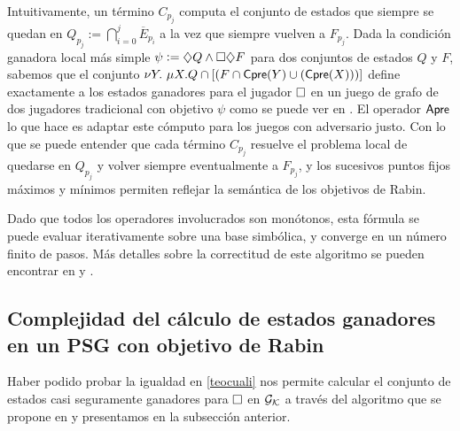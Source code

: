 
Intuitivamente, un término $C_{p_j}$ computa el conjunto de estados que siempre
se quedan en $Q_{p_j} := \bigcap_{i=0}^{j} \overline{E}_{p_i}$ a la vez que
siempre vuelven a $F_{p_j}$. Dada la condición ganadora local más simple $\psi
	:= \diamondsuit Q \wedge \square \diamondsuit F$ para dos conjuntos de estados $Q$ y $F$,
sabemos que el conjunto $\nu Y .\ \mu X.Q \cap [(F \cap \textsf{Cpre}(Y) \cup
		(\textsf{Cpre}(X)))]$ define exactamente a los estados ganadores para el jugador
$\square$ en un juego de grafo de dos jugadores tradicional con objetivo $\psi$
como se puede ver en \cite{MalerSynthesis}. El operador $\textsf{Apre}$ lo que hace es
adaptar este cómputo para los juegos con adversario justo. Con lo que se puede
entender que cada término $C_{p_j}$ resuelve el problema local de quedarse en
$Q_{p_j}$ y volver siempre eventualmente a $F_{p_j}$, y los sucesivos puntos
fijos máximos y mínimos permiten reflejar la semántica de los objetivos de
Rabin.

Dado que todos los operadores involucrados son monótonos, esta fórmula se puede
evaluar iterativamente sobre una base simbólica, y converge en un número finito
de pasos. Más detalles sobre la correctitud de este algoritmo se pueden
encontrar en \cite{Banerjee} y \cite{Piterman}.


\subsection*{Complejidad del cálculo de estados ganadores en un PSG con objetivo de Rabin}

Haber podido probar la igualdad en \ref{teocuali} nos permite calcular el
conjunto de estados casi seguramente ganadores para $\square$ en $\mathcal{G}_{\mathcal{K}}$ a través
del algoritmo que se propone en \cite{Banerjee} y presentamos en la subsección
anterior.


